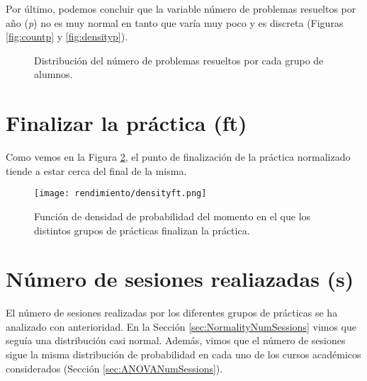 Por último, podemos concluir que la variable número de problemas resueltos por año (\emph{p}) no es muy normal en tanto que varía muy poco y es discreta (Figuras \ref{fig:countp} y \ref{fig:densityp}).

\begin{figure}[H]
\centering
{}\qquad
{}
\caption{Distribución del número de problemas resueltos por cada grupo de alumnos.}
\label{fig:normalityp}
\end{figure}

\section{Finalizar la práctica (ft)}

Como vemos en la Figura \ref{fig:densityplotft}, el punto de finalización de la práctica normalizado tiende a estar cerca del final de la misma.

 \begin{figure}[H]
    \centering
    \texttt{[image: rendimiento/densityft.png]}
    \caption{Función de densidad de probabilidad del momento en el que los distintos grupos de prácticas finalizan la práctica.}
    \label{fig:densityplotft}
\end{figure}

\section{Número de sesiones realiazadas (s)}

El número de sesiones realizadas por los diferentes grupos de prácticas se ha analizado con anterioridad. En la Sección \ref{sec:NormalityNumSessions} vimos que seguía una distribución casi normal. Además, vimos que el número de sesiones sigue la misma distribución de probabilidad en cada uno de los cursos académicos considerados (Sección \ref{sec:ANOVANumSessions}).



